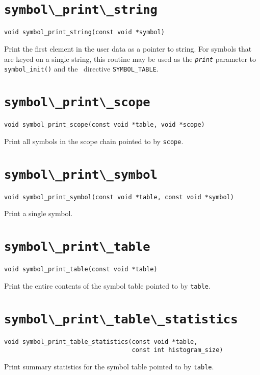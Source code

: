 \section{\protect\verb+symbol\_print\_string+}
\begin{verbatim}
void symbol_print_string(const void *symbol) 
\end{verbatim}
Print the first element in the user data as a pointer to string.
For symbols that are keyed on a
single string, this routine may be used as the {\tt\em print}
parameter to \verb+symbol_init()+ and the \rdp\ directive \verb+SYMBOL_TABLE+.


\section{\protect\verb+symbol\_print\_scope+}
\begin{verbatim}
void symbol_print_scope(const void *table, void *scope) 
\end{verbatim}
Print all symbols in the scope chain pointed to by {\tt scope}.

\section{\protect\verb+symbol\_print\_symbol+}
\begin{verbatim}
void symbol_print_symbol(const void *table, const void *symbol) 
\end{verbatim}
Print a single symbol.

\section{\protect\verb+symbol\_print\_table+}
\begin{verbatim}
void symbol_print_table(const void *table) 
\end{verbatim}
Print the entire contents of the symbol table pointed to by {\tt table}.

\section{\protect\verb+symbol\_print\_table\_statistics+}
\begin{verbatim}
void symbol_print_table_statistics(const void *table, 
                                   const int histogram_size)
\end{verbatim}
Print summary statistics for the symbol table pointed to by {\tt table}.

